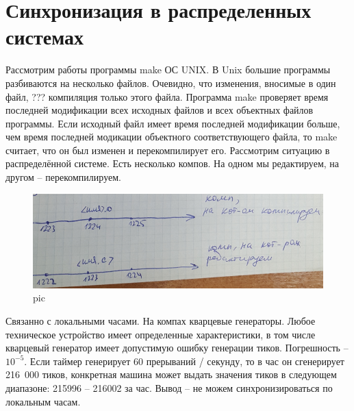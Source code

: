 \chapter{Синхронизация в распределенных системах}

Рассмотрим работы программы make ОС UNIX. В Unix большие программы разбиваются на несколько файлов. Очевидно, что изменения, вносимые в один файл, ??? компиляция только этого файла. Программа make проверяет время последней модификации всех исходных файлов и всех объектных файлов программы. Если исходный файл имеет время последней модификации больше, чем время последней модикации объектного соответствующего файла, то make считает, что он был изменен и перекомпилирует его. 
Рассмотрим ситуацию в распределённой системе. Есть несколько компов. На одном мы редактируем, на другом – перекомпилируем.

\begin{figure}[H]
    \centering
    \includegraphics[width=\textwidth]{pic/3.png}
    \caption{pic}
\end{figure}

Связанно с локальными часами. На компах кварцевые генераторы. Любое техническое устройство имеет определенные характеристики, в том числе кварцевый генератор имеет допустимую ошибку генерации тиков. Погрешность – $10^{-5}$. Если таймер генерирует 60 прерываний / секунду, то в час он сгенерирует 216 000 тиков, конкретная машина может выдать значения тиков в следующем диапазоне: 215996 – 216002 за час. Вывод – не можем синхронизироваться по локальным часам. 